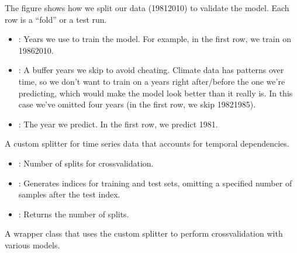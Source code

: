 \documentclass[letterpaper,10pt,english]{sphinxmanual}
\begin{document}
\sphinxAtStartPar
The figure shows how we split our data (1981\textendash{}2010) to validate the model. Each row is a “fold” or a test run.
\begin{itemize}
\item {} 
\sphinxAtStartPar
{}: Years we use to train the model. For example, in the first row, we train on 1986\textendash{}2010.

\item {} 
\sphinxAtStartPar
{}: A buffer years we skip to avoid cheating. Climate data has patterns over time, so we don’t want to train on a years right after/before the one we’re predicting, which would make the model look better than it really is. In this case we’ve omitted four years (in the first row, we skip 1982\sphinxhyphen{}1985).

\item {} 
\sphinxAtStartPar
{}: The year we predict. In the first row, we predict 1981.

\end{itemize}

\sphinxAtStartPar
{}

\sphinxAtStartPar
A custom splitter for time series data that accounts for temporal dependencies.

\sphinxAtStartPar
{}
\begin{itemize}
\item {} 
\sphinxAtStartPar
{}: Number of splits for cross\sphinxhyphen{}validation.

\end{itemize}

\sphinxAtStartPar
{}
\begin{itemize}
\item {} 
\sphinxAtStartPar
{}: Generates indices for training and test sets, omitting a specified number of samples after the test index.

\item {} 
\sphinxAtStartPar
{}: Returns the number of splits.

\end{itemize}

\sphinxAtStartPar
{}

\sphinxAtStartPar
A wrapper class that uses the custom splitter to perform cross\sphinxhyphen{}validation with various models.
\end{document}

